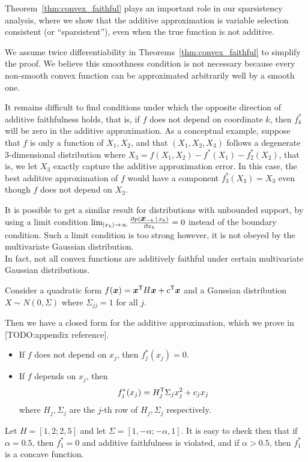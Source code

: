 Theorem~\ref{thm:convex_faithful} plays an important role in our
sparsistency analysis, where we show that the additive
approximation is variable selection consistent (or ``sparsistent''), even when the true function is not
additive.

\begin{remark}
  We assume twice differentiability in
  Theorems~\ref{thm:convex_faithful} to simplify the proof. 
  We believe
  this smoothness condition is not necessary because every non-smooth
  convex function can be approximated arbitrarily well by a smooth
  one.  
\end{remark}

\begin{remark} 
It remains difficult to find conditions under which the opposite direction of additive faithfulness holds, that is, if $f$ does not depend on coordinate $k$, then $f_k^*$ will be zero in the additive approximation. As a conceptual example, suppose that $f$ is only a function of $X_1, X_2$, and that $(X_1, X_2, X_3)$ follows a degenerate 3-dimensional distribution where $X_3 = f(X_1, X_2) - f^*(X_1) - f^*_2(X_2)$, that is, we let $X_3$ exactly capture the additive approximation error. In this case, the best additive approximation of $f$ would have a component $f^*_3(X_3) = X_3$ even though $f$ does not depend on $X_3$. 
\end{remark}

It is possible to get a similar result for distributions with unbounded support, by using a limit condition $\lim_{|x_k| \rightarrow \infty} \frac{\partial p(\mbox{\boldmath $x$}_{-k} {\,|\,} x_k)}{\partial x_k} = 0$ instead of the boundary condition. Such a limit condition is too strong however, it is not obeyed by the multivariate Gaussian distribution. \\

In fact, not all convex functions are additively faithful under certain multivariate Gaussian distributions. 

\begin{example}
\label{examp:gaussian_counterexample}
Consider a quadratic form $f( \mbox{\boldmath $x$}) = \mbox{\boldmath $x$}^{\mathsf{T}} H \mbox{\boldmath $x$} + c^{\mathsf{T}} \mbox{\boldmath $x$}$ and a Gaussian distribution $X \sim N(0, \Sigma)$ where $\Sigma_{jj} = 1$ for all $j$.

Then we have a closed form for the additive approximation, which we prove in [TODO:appendix reference].
\begin{itemize}
\item If $f$ does not depend on $x_j$, then $f^*_j(x_j) = 0$.
\item If $f$ depends on $x_j$, then
\[
f^*_j(x_j) = H_j^{\mathsf{T}} \Sigma_j x_j^2 + c_j x_j
\]
where $H_j, \Sigma_j$ are the $j$-th row of $H_j, \Sigma_j$ respectively. 
\end{itemize}
Let $H = [1, 2; 2,5]$ and let $\Sigma = [1, -\alpha; -\alpha, 1]$. It is easy to check then that if $\alpha=0.5$, then $f^*_1 = 0$ and additive faithfulness is violated, and if $\alpha > 0.5$, then $f^*_1$ is a concave function.
\end{example}

